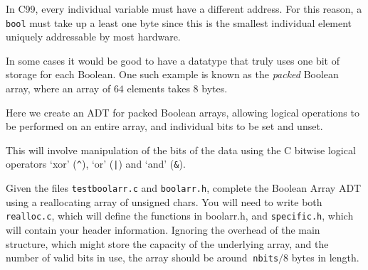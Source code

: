 
In C99, every individual variable must have a different address. For
this reason, a \verb^bool^ must take up a least one byte since this is
the smallest individual element uniquely addressable by most hardware.

In some cases it would be good to have a datatype that truly uses one bit
of storage for each Boolean. One such example is known as the  {\it packed}
Boolean array, where an array of $64$ elements takes $8$ bytes.

Here we create an ADT for packed Boolean arrays, allowing logical
operations to be performed on an entire array, and individual bits to
be set and unset.

\noindent
This will involve manipulation of the bits of the data
using the C bitwise logical operators `xor' (\verb#^#), `or' (\verb^|^) and `and' (\verb^&^).

\begin{exercise}
\label{ex:packedboolarr}
Given the files \verb^testboolarr.c^ and \verb^boolarr.h^, complete the
Boolean Array ADT using a reallocating array of unsigned chars. You will
need to write both \verb^realloc.c^, which will define the functions
in boolarr.h, and \verb^specific.h^, which will contain your header
information.  Ignoring the overhead of the main structure, which might
store the capacity of the underlying array, and the number of valid bits
in use, the array should be around $~$\verb^nbits^$/8$ bytes in length.
\end{exercise}
